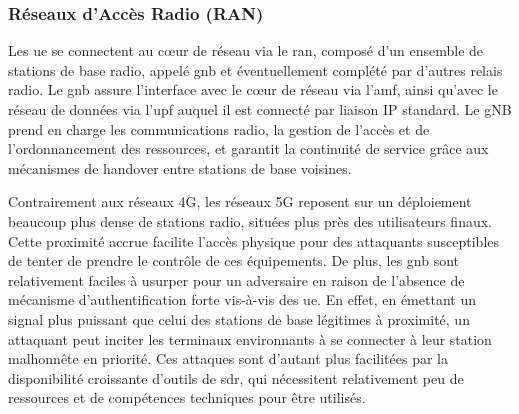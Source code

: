 \documentclass[a4paper,11pt,twoside]{StyleThese}
\begin{document}


\subsubsection{Réseaux d'Accès Radio (RAN)}
Les \gls{ue} se connectent au cœur de réseau via le \gls{ran}, composé d’un ensemble de stations de base radio, appelé \gls{gnb} et éventuellement complété par d’autres relais radio. Le \gls{gnb} assure l’interface avec le cœur de réseau via l’\gls{amf}, ainsi qu’avec le réseau de données via l’\gls{upf} auquel il est connecté par liaison IP standard. Le gNB prend en charge les communications radio, la gestion de l’accès et de l’ordonnancement des ressources, et garantit la continuité de service grâce aux mécanismes de handover entre stations de base voisines. 

Contrairement aux réseaux 4G, les réseaux 5G reposent sur un déploiement beaucoup plus dense de stations radio, situées plus près des utilisateurs finaux. Cette proximité accrue facilite l’accès physique pour des attaquants susceptibles de tenter de prendre le contrôle de ces équipements. De plus, les \gls{gnb} sont relativement faciles à usurper pour un adversaire en raison de l’absence de mécanisme d’authentification forte vis-à-vis des \gls{ue}. En effet, en émettant un signal plus puissant que celui des stations de base légitimes à proximité, un attaquant peut inciter les terminaux environnants à se connecter à leur station malhonnête en priorité\cite{mahyoub_security_2024}. Ces attaques sont d’autant plus facilitées par la disponibilité croissante d’outils de \gls{sdr}, qui nécessitent relativement peu de ressources et de compétences techniques pour être utilisés.
\end{document}
